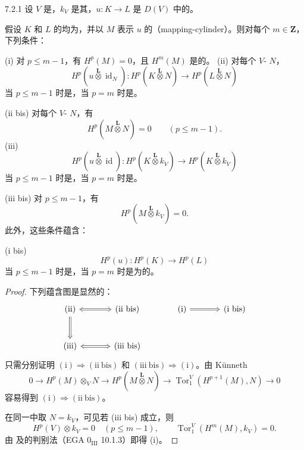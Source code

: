 \begin{SGAresult}{}{7.2.1}
设 $V$ 是，$k_V$ 是其，$u:K\to L$ 是 $D(V)$ 中的。

假设 $K$ 和 $L$ 的均为，并以 $M$ 表示 $u$ 的（mapping-cylinder）。则对每个 $m\in\mathbf Z$，下列条件：

(i) 对 $p\le m-1$，有 $H^p(M)=0$，且 $H^m(M)$ 是的。
(ii) 对每个 $V$- $N$，
\[
 H^p(u\mathbin{\overset{\mathbf L}{\otimes}}\operatorname{id}_N):
 H^p(K\mathbin{\overset{\mathbf L}{\otimes}}N)\longrightarrow
 H^p(L\mathbin{\overset{\mathbf L}{\otimes}}N)
\]
当 $p\le m-1$ 时是，当 $p=m$ 时是。

(ii bis) 对每个 $V$- $N$，有
\[
 H^p(M\mathbin{\overset{\mathbf L}{\otimes}}N)=0\qquad(p\le m-1).
\]
(iii) 
\[
 H^p(u\mathbin{\overset{\mathbf L}{\otimes}}\operatorname{id}):
 H^p(K\mathbin{\overset{\mathbf L}{\otimes}}k_V)\longrightarrow
 H^p(K\mathbin{\overset{\mathbf L}{\otimes}}k_V)
\]
当 $p\le m-1$ 时是，当 $p=m$ 时是。

(iii bis) 对 $p\le m-1$，有
\[
 H^p(M\mathbin{\overset{\mathbf L}{\otimes}}k_V)=0.
\]
此外，这些条件蕴含：

(i bis) 
\[
 H^p(u):H^p(K)\longrightarrow H^p(L)
\]
当 $p\le m-1$ 时是，当 $p=m$ 时是为的。
\end{SGAresult}
\begin{proof}
下列蕴含图是显然的：
\[
\begin{tikzcd}[column sep=large,row sep=large]
 (\mathrm{ii})\arrow[r,Leftrightarrow]\arrow[d,Rightarrow]&(\mathrm{ii\ bis})
 &(\mathrm{i})\arrow[r,Rightarrow]&(\mathrm{i\ bis})\\
 (\mathrm{iii})\arrow[r,Leftrightarrow]&(\mathrm{iii\ bis})&&
\end{tikzcd}
\]
只需分别证明 $(\mathrm{i})\Rightarrow(\mathrm{ii\ bis})$ 和 $(\mathrm{iii\ bis})\Rightarrow(\mathrm{i})$。由 Künneth 
\[
 0\longrightarrow H^p(M)\otimes_VN\longrightarrow
 H^p(M\mathbin{\overset{\mathbf L}{\otimes}}N)\longrightarrow
 \operatorname{Tor}_1^V(H^{p+1}(M),N)\longrightarrow0
\]
容易得到 $(\mathrm{i})\Rightarrow(\mathrm{ii\ bis})$。

在同一中取 $N=k_V$，可见若 (iii bis) 成立，则
\[
 H^p(V)\otimes k_V=0\quad(p\le m-1),\qquad
 \operatorname{Tor}_1^V(H^m(M),k_V)=0.
\]
由 及的判别法（EGA $0_{\mathrm{III}}$ 10.1.3）即得 (i)。
\end{proof}

